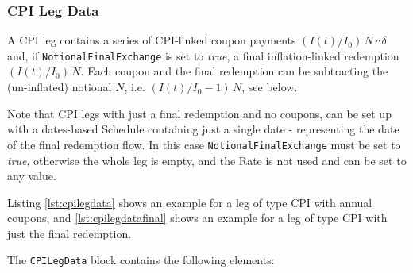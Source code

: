 \subsubsection{CPI Leg Data}
\label{ss:cpilegdata}

A CPI leg contains a series of CPI-linked coupon payments $(I(t)/I_0)\,N\,c\,\delta$ and, if \lstinline!NotionalFinalExchange! is set to \emph{true}, a final
inflation-linked redemption $(I(t)/I_0)\,N$. Each coupon and the final redemption can be
subtracting the (un-inflated) notional $N$, i.e. $(I(t)/I_0-1)\,N$,
see below.

Note that CPI legs with just a final redemption and no coupons, can be set up with a dates-based Schedule containing just a single date - representing the date of the final redemption flow. In this case \lstinline!NotionalFinalExchange! must be set to \emph{true}, otherwise the whole leg is empty, and the Rate is not used and can be set to any value. 

Listing \ref{lst:cpilegdata} shows an example for a leg of type CPI with annual coupons, and \ref{lst:cpilegdatafinal} shows an example for a leg of type CPI with just the final redemption. 

The  \lstinline!CPILegData! block contains the following elements:

